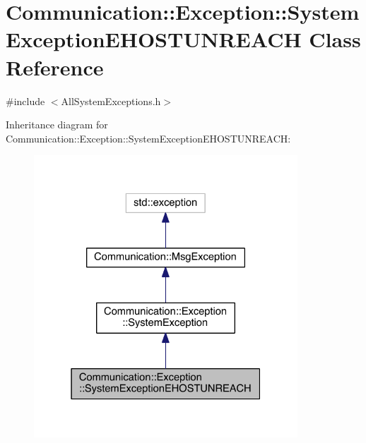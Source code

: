 \hypertarget{class_communication_1_1_exception_1_1_system_exception_e_h_o_s_t_u_n_r_e_a_c_h}{}\section{Communication\+:\+:Exception\+:\+:System\+Exception\+E\+H\+O\+S\+T\+U\+N\+R\+E\+A\+C\+H Class Reference}
\label{class_communication_1_1_exception_1_1_system_exception_e_h_o_s_t_u_n_r_e_a_c_h}


{\ttfamily \#include $<$All\+System\+Exceptions.\+h$>$}



Inheritance diagram for Communication\+:\+:Exception\+:\+:System\+Exception\+E\+H\+O\+S\+T\+U\+N\+R\+E\+A\+C\+H\+:\nopagebreak
\begin{figure}[H]
\begin{center}
\leavevmode
\includegraphics[width=280pt]{class_communication_1_1_exception_1_1_system_exception_e_h_o_s_t_u_n_r_e_a_c_h__inherit__graph}
\end{center}
\end{figure}


